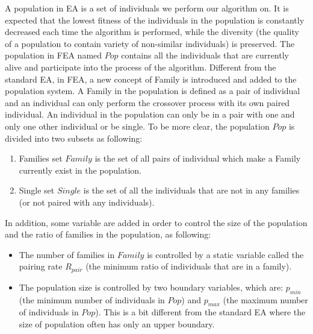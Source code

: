\documentclass[final]{elsarticle}
\begin{document}
A population in EA is a set of individuals we perform our algorithm on. It is expected that the lowest fitness of the individuals in the population is constantly decreased each time the algorithm is performed, while the diversity (the quality of a population to contain variety of non-similar individuals) is preserved. The population in FEA named $Pop$ contains all the individuals that are currently alive and participate into the process of the algorithm. Different from the standard EA, in FEA, a new concept of Family is introduced and added to the population system. A Family in the population is defined as a pair of individual and an individual can only perform the crossover process with its own paired individual. An individual in the population can only be in a pair with one and only one other individual or be single. To be more clear, the population $Pop$ is divided into two subsets as following:
\begin{enumerate}
	\item Families set $Family$ is the set of all pairs of individual which make a Family currently exist in the population.
	\item Single set $Single$ is the set of all the individuals that are not in any families (or not paired with any individuals). 
\end{enumerate}
In addition, some variable are added in order to control the size of the population and the ratio of families in the population, as following:
\begin{itemize}
	\item The number of families in $Family$ is controlled by a static variable called the pairing rate $R_{pair}$ (the minimum ratio of individuals that are in a family).
	\item The population size is controlled by two boundary variables, which are: $p_{min}$ (the minimum number of individuals in $Pop$) and $p_{max}$ (the maximum number of individuals in $Pop$). This is a bit different from the standard EA where the size of population often has only an upper boundary.
\end{itemize}
\end{document}
